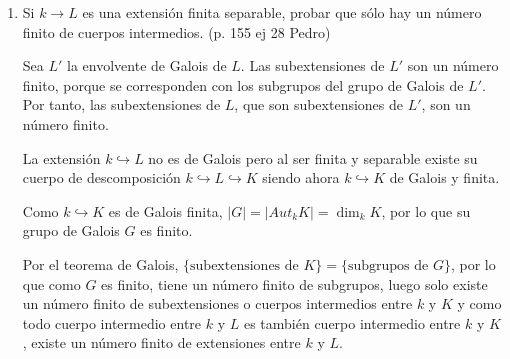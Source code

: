 \begin{enumerate}
\begin{dem}
\begin{itemize}
\begin{itemize}
$$\begin{cases}
                \end{cases} \Rightarrow \begin{cases}
                    K^{\langle H_{1}, H_{2} \rangle} \subseteq K^{H_1} \\ K^{\langle H_{1}, H_{2} \rangle} \subseteq K^{H_2}
                \end{cases} \Rightarrow K^{\langle H_{1}, H_{2} \rangle} \subseteq K^{H_1} \cap K^{H_2}$$
                pues si pertenece a ambos, pertenece a la intersecci\'on.
                \item $\boxed{\subseteq}$ Sea $\alpha \in K^{H_1} \cap K^{H_2} \Rightarrow \alpha\in K^{H_1}$ y $\alpha \in K^{H_2}$, por lo que $\tau(\alpha) = \alpha \, \forall \, \tau \in H_1 \cup H_2$. Como los automorfismos que dejan fijo $\alpha$ es un subgrupo y contiene a $H_1$ y a $H_2$, entonces contiene al m\'inimo que alberga a los dos, que es $\langle H_{1}, H_{2} \rangle $, es decir, $\langle H_{1}, H_{2} \rangle $ deja fijo $\alpha$, por lo que $K^{H_1} \cap K^{H_2} \subseteq K^{\langle H_{1}, H_{2} \rangle }$. 
            \end{itemize}
        \end{itemize}
    \end{dem} 

    \item Si $k \rightarrow L$ es una extensión finita separable, probar que sólo hay un número finito de cuerpos intermedios. (p. 155 ej 28 Pedro)
    \begin{dem}
        [Pedro] Sea $L'$ la envolvente de Galois de $L$. Las subextensiones de $L'$ son un número finito, porque se corresponden con los subgrupos del grupo de Galois de $L'$. Por tanto, las subextensiones de $L$, que son subextensiones de $L'$, son un número finito.
    \end{dem}
    \begin{dem}
        [Sara] La extensión $k \hookrightarrow L$ no es de Galois pero al ser finita y separable existe su cuerpo de descomposici\'on $k \hookrightarrow L \hookrightarrow K$ siendo ahora $k\hookrightarrow K$ de Galois y finita. 

        Como $k \hookrightarrow K$ es de Galois finita, $|G| = |Aut_k K| = \dim_k K$, por lo que su grupo de Galois $G$ es finito.
        
        Por el teorema de Galois, $\{\text{subextensiones de } K \}= \{\text{subgrupos de }G\}$, por lo que como $G$ es finito, tiene un n\'umero finito de subgrupos, luego solo existe un n\'umero finito de subextensiones o cuerpos intermedios entre $k$ y $K$ y como todo cuerpo intermedio entre $k$ y $L$ es tambi\'en cuerpo intermedio entre $k$ y $K$, existe un n\'umero finito de extensiones entre $k$ y $L$. 
    \end{dem}
    

\end{enumerate}
